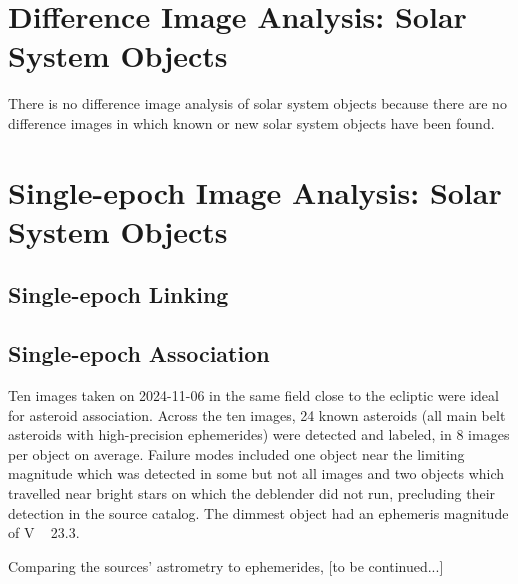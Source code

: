 \section{Difference Image Analysis: Solar System Objects}
\label{sec:dia_solar_system}

There is no difference image analysis of solar system objects because there are no difference images in which known or new solar system objects have been found.

\section{Single-epoch Image Analysis: Solar System Objects}
\label{sec:sia_solar_system}

\subsection{Single-epoch Linking}
\label{sec:linking}

\subsection{Single-epoch Association}
\label{sec:association}

Ten images taken on 2024-11-06 in the same field close to the ecliptic were ideal for asteroid association. Across the ten images, 24 known asteroids (all main belt asteroids with high-precision ephemerides) were detected and labeled, in 8 images per object on average. Failure modes included one object near the limiting magnitude which was detected in some but not all images and two objects which travelled near bright stars on which the deblender did not run, precluding their detection in the source catalog. The dimmest object had an ephemeris magnitude of V ~ 23.3. 

Comparing the sources' astrometry to ephemerides, [to be continued...]


